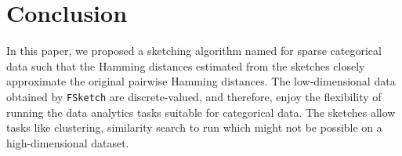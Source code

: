\section{Conclusion}\label{sec:conclusion}
In this paper, we proposed a sketching algorithm named \fsketch for sparse categorical data such that the Hamming distances estimated from the sketches closely approximate the original pairwise Hamming distances. The low-dimensional data obtained by \texttt{FSketch} are discrete-valued, and therefore, enjoy the flexibility of running the data analytics tasks suitable for categorical data. The sketches allow tasks like clustering, similarity search to run which might not be possible on a high-dimensional dataset.%


